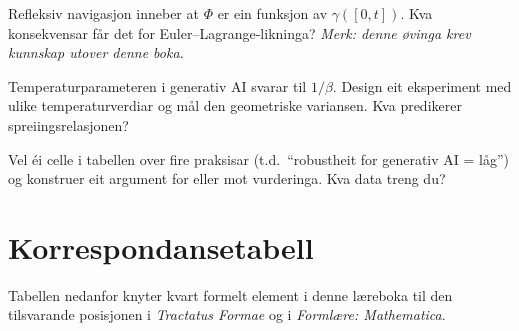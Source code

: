 \begin{exercise}[Nivå 3]\label{ex:9.5}
Refleksiv navigasjon inneber at $\Phi$ er ein funksjon av
$\gamma([0, t])$. Kva konsekvensar får det for
Euler--Lagrange-likninga? \emph{Merk: denne øvinga krev kunnskap
utover denne boka.}
\end{exercise}

\begin{exercise}[Nivå 3]\label{ex:9.6}
Temperaturparameteren i generativ AI svarar til $1/\beta$.
Design eit eksperiment med ulike temperaturverdiar og mål den
geometriske variansen. Kva predikerer spreiingsrelasjonen?
\end{exercise}

\begin{exercise}[Nivå 3]\label{ex:9.7}
Vel éi celle i tabellen over fire praksisar (t.d.\
``robustheit for generativ AI = låg'') og konstruer eit argument
for eller mot vurderinga. Kva data treng du?
\end{exercise}


\appendix

\chapter{Korrespondansetabell}
\label{app:korrespondanse}

Tabellen nedanfor knyter kvart formelt element i denne læreboka
til den tilsvarande posisjonen i \emph{Tractatus Formae} og i
\emph{Formlære: Mathematica}.

